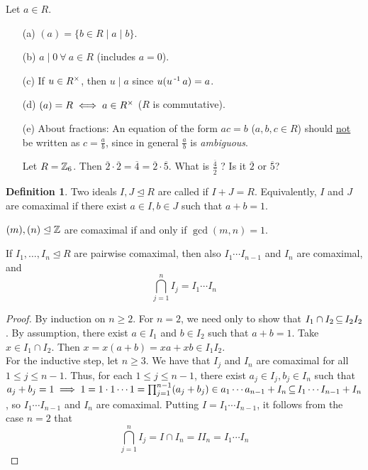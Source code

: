 \documentclass[11pt]{book}
\theoremstyle{definition}   \newtheorem{defn}[counter]{Definition} %
\newcommand{\ov}{\overline}   \newcommand{\wt}{\widetilde}
\newcommand{\nsg}{\mathrel{\unlhd}}   \newcommand{\ind}{\parindent24pt}   \newcommand{\vn}{\varnothing}
\newcommand{\vs}{\vspace{8pt}}
\numberwithin{counter}{chapter}
\begin{document}
\begin{remark}
Let $a \in R$.
\begin{enumerate}
\item[(a)] $(a) = \{b \in R \mid a \mid b\}$.
\item[(b)] $a \mid 0 \ \forall \ a \in R$ (includes $a = 0$).
\item[(c)] If $u \in R^{\times}$, then $u \mid a$ since $u(u\operatorname{^{-1}} a) = a$.
\item[(d)] $(a) = R \iff a \in R^{\times}$ ($R$ is commutative).
\item[(e)] About fractions: An equation of the form $ac = b$ ($a,b,c \in R$) should \underline{not} be written as $c = \frac{a}{b}$, since in general $\frac{a}{b}$ is \emph{ambiguous}.
\begin{example*}
Let $R = \operatorname{\mathbb{Z}}_6$. Then $\ov{2} \cdot \ov{2} = \ov{4} = \ov{2} \cdot \ov{5}$. What is $\frac{\ov{4}}{\ov{2}}$ ? Is it $\ov{2}$ or $\ov{5}$?
\end{example*}
\end{enumerate}
\end{remark}

\vs

\begin{defn}
Two ideals $I,J \nsg R$ are called  if $I+J = R$. Equivalently, $I$ and $J$ are comaximal if there exist $a \in I, b \in J$ such that $a+b = 1$.
\end{defn}

\vs

\begin{example*}
$(m), (n) \nsg \z$ are comaximal if and only if $\gcd(m,n) = 1$.
\end{example*}

\vs

\begin{lemma}
If $I_1, \dots, I_n \nsg R$ are pairwise comaximal, then also $I_1 \cdots I_{n-1}$ and $I_n$ are comaximal, and
	\[\bigcap_{j=1}^n I_j = I_1 \cdots I_n \]
\end{lemma}

\begin{proof}
By induction on $n \geq 2$. For $n = 2$, we need only to show that $I_1 \cap I_2 \operatorname{\subseteq} I_2 I_2$. By assumption, there exist $a \in I_1$ and $b \in I_2$ such that $a+b = 1$. Take $x \in I_1 \cap I_2$. Then $x = x(a+b) = xa + xb \in I_1 I_2$. \\

For the inductive step, let $n \geq 3$. We have that $I_j$ and $I_n$ are comaximal for all $1 \leq j \leq n-1$. Thus, for each $1 \leq j \leq n-1$, there exist $a_j \in I_j, b_j \in I_n$ such that $a_j + b_j = 1 \implies 1 = 1 \cdot 1 \cdots 1 = \prod_{j=1}^{n-1} (a_j + b_j) \in a_1 \cdots a_{n-1} + I_n \operatorname{\subseteq} I_1 \cdots I_{n-1} + I_n$, so $I_1 \cdots I_{n-1}$ and $I_n$ are comaximal. Putting $I = I_1 \cdots I_{n-1}$, it follows from the case $n=2$ that
	\[\bigcap_{j=1}^n I_j = I \cap I_n = I I_n = I_1 \cdots I_n \]
\end{proof}
\end{document}
